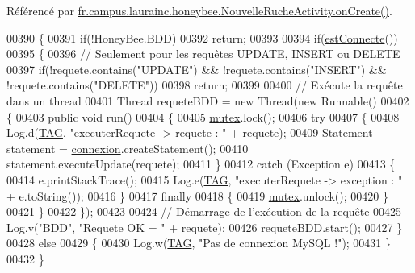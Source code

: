Référencé par \hyperlink{classfr_1_1campus_1_1laurainc_1_1honeybee_1_1_nouvelle_ruche_activity_ae97fec78fb0a2e1cc4610182bc71ea0d}{fr.\+campus.\+laurainc.\+honeybee.\+Nouvelle\+Ruche\+Activity.\+on\+Create()}.


\begin{DoxyCode}
00390     \{
00391         \textcolor{keywordflow}{if}(!HoneyBee.BDD)
00392             \textcolor{keywordflow}{return};
00393 
00394         \textcolor{keywordflow}{if}(\hyperlink{classfr_1_1campus_1_1laurainc_1_1honeybee_1_1_base_de_donnees_a735f54c2c183a595c9a9a5ba947491f5}{estConnecte}())
00395         \{
00396             \textcolor{comment}{// Seulement pour les requêtes UPDATE, INSERT ou DELETE}
00397             \textcolor{keywordflow}{if}(!requete.contains(\textcolor{stringliteral}{"UPDATE"}) && !requete.contains(\textcolor{stringliteral}{"INSERT"}) && !requete.contains(\textcolor{stringliteral}{"DELETE"}))
00398                 \textcolor{keywordflow}{return};
00399 
00400             \textcolor{comment}{// Exécute la requête dans un thread}
00401             Thread requeteBDD = \textcolor{keyword}{new} Thread(\textcolor{keyword}{new} Runnable()
00402             \{
00403                 \textcolor{keyword}{public} \textcolor{keywordtype}{void} run()
00404                 \{
00405                     \hyperlink{classfr_1_1campus_1_1laurainc_1_1honeybee_1_1_base_de_donnees_a0dd6f285a11459c086adea6080bed282}{mutex}.lock();
00406                     \textcolor{keywordflow}{try}
00407                     \{
00408                         Log.d(\hyperlink{classfr_1_1campus_1_1laurainc_1_1honeybee_1_1_base_de_donnees_ae800d867b3e423dd139e982736ab5587}{TAG}, \textcolor{stringliteral}{"executerRequete -> requete : "} + requete);
00409                         Statement statement = \hyperlink{classfr_1_1campus_1_1laurainc_1_1honeybee_1_1_base_de_donnees_a358899633f17b8cd00dd2c4cfdd40abe}{connexion}.createStatement();
00410                         statement.executeUpdate(requete);
00411                     \}
00412                     \textcolor{keywordflow}{catch} (Exception e)
00413                     \{
00414                         e.printStackTrace();
00415                         Log.e(\hyperlink{classfr_1_1campus_1_1laurainc_1_1honeybee_1_1_base_de_donnees_ae800d867b3e423dd139e982736ab5587}{TAG}, \textcolor{stringliteral}{"executerRequete -> exception : "} + e.toString());
00416                     \}
00417                     \textcolor{keywordflow}{finally}
00418                     \{
00419                         \hyperlink{classfr_1_1campus_1_1laurainc_1_1honeybee_1_1_base_de_donnees_a0dd6f285a11459c086adea6080bed282}{mutex}.unlock();
00420                     \}
00421                 \}
00422             \});
00423 
00424             \textcolor{comment}{// Démarrage de l'exécution de la requête}
00425             Log.v(\textcolor{stringliteral}{"BDD"}, \textcolor{stringliteral}{"Requete OK = "} + requete);
00426             requeteBDD.start();
00427         \}
00428         \textcolor{keywordflow}{else}
00429         \{
00430             Log.w(\hyperlink{classfr_1_1campus_1_1laurainc_1_1honeybee_1_1_base_de_donnees_ae800d867b3e423dd139e982736ab5587}{TAG}, \textcolor{stringliteral}{"Pas de connexion MySQL !"});
00431         \}
00432     \}
\end{DoxyCode}
